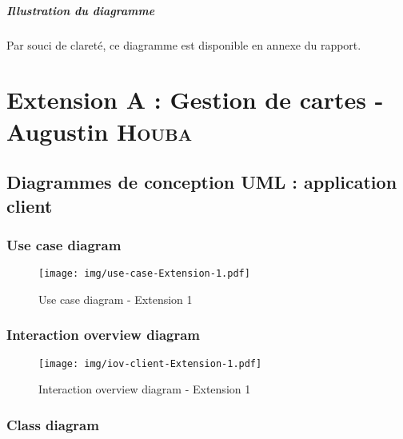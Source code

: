 \documentclass[]{report}
\begin{document}


\vspace*{\fill}

\paragraph{Illustration du diagramme} Par souci de clareté, ce diagramme est disponible en annexe du rapport.

\newpage





\chapter{Extension A : Gestion de cartes - Augustin \textsc{Houba}}



\newpage


\section{Diagrammes de conception UML : application client}

\subsection{Use case diagram}
\begin{figure}[h]
	\centering\texttt{[image: img/use-case-Extension-1.pdf]}
	\caption{Use case diagram - Extension 1}
\end{figure}




\newpage

\subsection{Interaction overview diagram}

\begin{figure}[h!]
	\centering\texttt{[image: img/iov-client-Extension-1.pdf]}
	\caption{Interaction overview diagram - Extension 1}
\end{figure}



\newpage

\subsection{Class diagram}
\end{document}
